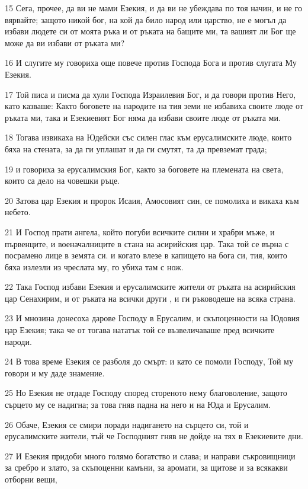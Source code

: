 \par 15 Сега, прочее, да ви не мами Езекия, и да ви не убеждава по тоя начин, и не го вярвайте; защото никой бог, на кой да било народ или царство, не е могъл да избави людете си от моята ръка и от ръката на бащите ми, та вашият ли Бог ще може да ви избави от ръката ми?
\par 16 И слугите му говориха още повече против Господа Бога и против слугата Му Езекия.
\par 17 Той писа и писма да хули Господа Израилевия Бог, и да говори против Него, като казваше: Както боговете на народите на тия земи не избавиха своите люде от ръката ми, така и Езекиевият Бог няма да избави своите люде от ръката ми.
\par 18 Тогава извикаха на Юдейски със силен глас към ерусалимските люде, които бяха на стената, за да ги уплашат и да ги смутят, та да превземат града;
\par 19 и говориха за ерусалимския Бог, както за боговете на племената на света, които са дело на човешки ръце.
\par 20 Затова цар Езекия и пророк Исаия, Амосовият син, се помолиха и викаха към небето.
\par 21 И Господ прати ангела, който погуби всичките силни и храбри мъже, и първенците, и военачалниците в стана на асирийския цар. Така той се върна с посрамено лице в земята си. и когато влезе в капището на бога си, тия, които бяха излезли из чреслата му, го убиха там с нож.
\par 22 Така Господ избави Езекия и ерусалимските жители от ръката на асирийския цар Сенахирим, и от ръката на всички други , и ги ръководеше на всяка страна.
\par 23 И мнозина донесоха дарове Господу в Ерусалим, и скъпоценности на Юдовия цар Езекия; така че от тогава нататък той се възвеличаваше пред всичките народи.
\par 24 В това време Езекия се разболя до смърт: и като се помоли Господу, Той му говори и му даде знамение.
\par 25 Но Езекия не отдаде Господу според стореното нему благоволение, защото сърцето му се надигна; за това гняв падна на него и на Юда и Ерусалим.
\par 26 Обаче, Езекия се смири поради надигането на сърцето си, той и ерусалимските жители, тъй че Господният гняв не дойде на тях в Езекиевите дни.
\par 27 И Езекия придоби много голямо богатство и слава; и направи съкровищници за сребро и злато, за скъпоценни камъни, за аромати, за щитове и за всякакви отборни вещи,
